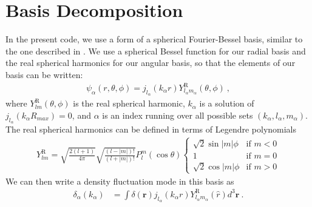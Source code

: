\documentclass[a4paper,11pt]{article}
\newcommand{\sph}[2]{Y^\text{R}_{l_#1 m_#1}(\hat{#2})}
\newcommand{\jl}[1]{j_{l_#1}}
\begin{document}
\section{Basis Decomposition}
\label{sec:basis}
In the present code, we use a form of a spherical Fourier-Bessel basis, similar to the one described in \cite{spherical_fourier_bessel}. We use a spherical Bessel function for our radial basis and the real spherical harmonics for our angular basis, so that the elements of our basis can be written:
\begin{align} \label{basis_decomp}
\psi_\alpha(r, \theta, \phi) = j_{l_\alpha}(k_\alpha r) Y^\text{R}_{l_\alpha m_\alpha}(\theta, \phi) ~, 
\end{align} 
where $Y^\text{R}_{lm}(\theta, \phi) $ is the real spherical harmonic, $k_\alpha$ is a solution of $j_{l_\alpha}(k_\alpha R_{max})=0$, and $\alpha$ is an index running over all possible sets $(k_\alpha,l_\alpha,m_\alpha)$. The real spherical harmonics can be defined in terms of Legendre polynomials
\begin{align}\label{real_harmonic2}
Y^\text{R}_{lm} = \sqrt{\frac{2(l+1)}{4\pi}}\sqrt{\frac{(l-|m|)!}{(l+|m|)!}}P^m_l(\cos{\theta})
\begin{cases}
\sqrt{2}\sin{|m|\phi}&\text{if } m<0\\
1& \text{if } m=0\\
\sqrt{2}\cos{|m|\phi}&\text{if } m>0
\end{cases}
\end{align}
We can then write a density fluctuation mode in this basis as
\begin{align}\label{ss_mode}
\delta_\alpha(k_\alpha)& = \int \delta(\mathbf{r}) \jl{\alpha}(k_\alpha r) \sph{\alpha}{r} d^3 \mathbf{r}~. 
\end{align}
\end{document}
